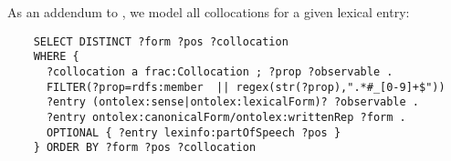 


\label{app-queries}

As an addendum to , we model
    all collocations for a given lexical entry:

    {\listingsize
\begin{verbatim}
    SELECT DISTINCT ?form ?pos ?collocation
    WHERE {
      ?collocation a frac:Collocation ; ?prop ?observable .
      FILTER(?prop=rdfs:member  || regex(str(?prop),".*#_[0-9]+$"))
      ?entry (ontolex:sense|ontolex:lexicalForm)? ?observable .
      ?entry ontolex:canonicalForm/ontolex:writtenRep ?form .
      OPTIONAL { ?entry lexinfo:partOfSpeech ?pos } 
    } ORDER BY ?form ?pos ?collocation
\end{verbatim}
}

